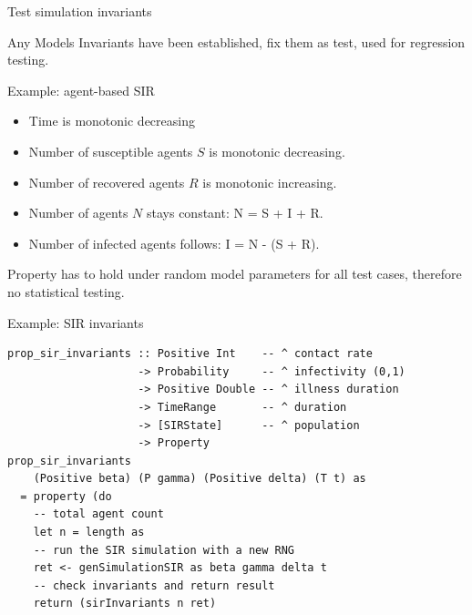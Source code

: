 \documentclass{beamer} %
\begin{document}
\begin{frame}{Test simulation invariants}
\begin{block}{Any Models}
Invariants have been established, fix them as test, used for regression testing.
\end{block}
\begin{block}{Example: agent-based SIR}
\begin{itemize}
	\item Time is monotonic decreasing
	\item Number of susceptible agents $S$ is monotonic decreasing.
	\item Number of recovered agents $R$ is monotonic increasing.
	\item Number of agents $N$ stays constant: N = S + I + R.
	\item Number of infected agents follows: I = N - (S + R).
\end{itemize}
\end{block}

\begin{block}{}
Property has to hold under random model parameters for all test cases, therefore no statistical testing.
\end{block}
\end{frame}

\begin{frame}[fragile]{Example: SIR invariants}
\begin{verbatim}
prop_sir_invariants :: Positive Int    -- ^ contact rate
                    -> Probability     -- ^ infectivity (0,1)
                    -> Positive Double -- ^ illness duration
                    -> TimeRange       -- ^ duration
                    -> [SIRState]      -- ^ population
                    -> Property
prop_sir_invariants 
    (Positive beta) (P gamma) (Positive delta) (T t) as  
  = property (do
    -- total agent count
    let n = length as
    -- run the SIR simulation with a new RNG 
    ret <- genSimulationSIR as beta gamma delta t
    -- check invariants and return result
    return (sirInvariants n ret)
\end{verbatim}
\end{frame}
\end{document}
